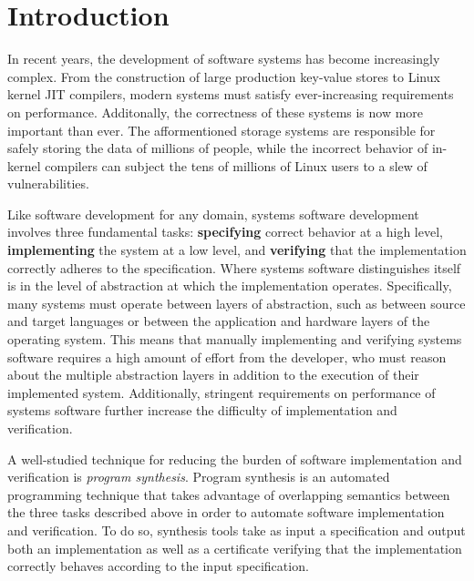 \chapter{Introduction}

In recent years, the development of software systems has become increasingly
complex.
From the construction of large production key-value stores to Linux kernel JIT compilers,
modern systems must satisfy ever-increasing requirements on performance.
Additonally, the
correctness of these systems is now more important than ever. The
afformentioned storage systems are responsible for safely storing the data
of millions of people, while
the incorrect behavior of in-kernel compilers can subject the tens of millions of
Linux users to a slew of vulnerabilities.

Like software development for any domain, systems software development involves
three fundamental tasks:
\textbf{specifying} correct behavior at a high level,
\textbf{implementing} the system at a low level,
and \textbf{verifying} that the implementation correctly adheres to the specification.
Where systems software distinguishes itself is in the level of abstraction
at which the implementation operates.
Specifically, many systems must operate between layers of abstraction,
such as between source and target languages or between the application and
hardware layers of the operating system.
This means that manually implementing and verifying systems software requires
a high amount of effort from the developer, who must reason about the multiple abstraction
layers in addition to the execution of their implemented system.
Additionally, stringent requirements on performance of systems software
further increase the difficulty of implementation and verification.

A well-studied technique for reducing the burden of software implementation
and verification is \textit{program synthesis}.
Program synthesis is an automated programming technique
that takes advantage of overlapping semantics between the three tasks described above
in order to automate software implementation and verification. 
To do so, synthesis tools take as input a specification and output both an implementation
as well as a certificate verifying that the implementation correctly behaves
according to the input specification.


